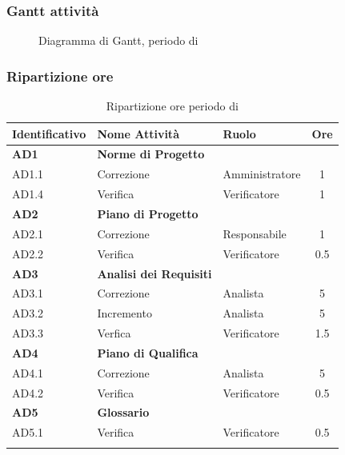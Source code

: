 \subsubsection{Gantt attività}
\begin{figure}[H]
	\centering
	\caption{Diagramma di Gantt, periodo di \AD{}}
\end{figure}

\subsubsection{Ripartizione ore}
\bgroup
\begin{longtable}{|l|l|l|c|}
	\endfirsthead
	\hline
	\textbf{Identificativo} &
	\textbf{Nome Attività} &
	\textbf{Ruolo} &
	\textbf{Ore}\\
	\endhead
	\hline
	\textbf{AD1} & \textbf{Norme di Progetto} &  &  \\
		\hline
		{AD1.1} & {Correzione} & Amministratore  & 1\\
		\hline
		{AD1.4} & {Verifica} & Verificatore & 1 \\
		\hline
	\textbf{AD2} & \textbf{Piano di Progetto}  & & \\
	\hline
		{AD2.1} & {Correzione} & Responsabile &  1\\
		\hline
		{AD2.2} & {Verifica} & Verificatore & 0.5 \\
		\hline
	\textbf{AD3} & \textbf{Analisi dei Requisiti} & &  \\
		\hline
		{AD3.1} & {Correzione} & Analista  &  5\\
		\hline
		{AD3.2} & {Incremento} & Analista  &  5\\
		\hline
		{AD3.3} & {Verfica} & Verificatore  &  1.5\\
		\hline
	\textbf{AD4} & \textbf{Piano di Qualifica} & &  \\
	\hline
		{AD4.1} & {Correzione} & Analista &  5 \\
		\hline
		{AD4.2} & {Verifica} & Verificatore &  0.5 \\
		\hline
	\textbf{AD5} & \textbf{Glossario} & &  \\
	\hline
		{AD5.1} & {Verifica} & Verificatore &  0.5 \\
	\hline
	\caption{Ripartizione ore periodo di \AD{}}
\end{longtable}
\egroup

